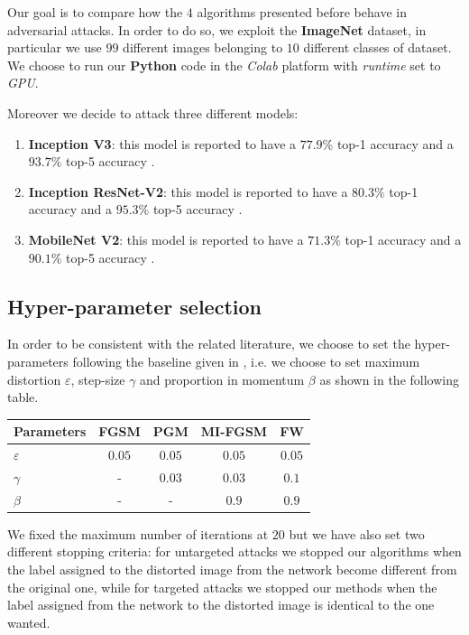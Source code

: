 \documentclass[10pt,twocolumn,letterpaper, english]{article}
\theoremstyle{definition}
\theoremstyle{plain}
\theoremstyle{plain}
\theoremstyle{plain}
\theoremstyle{plain}
\theoremstyle{remark}
\theoremstyle{remark}
\theoremstyle{definition}
\theoremstyle{definition}
\theoremstyle{definition}
\theoremstyle{definition}
\renewcommand{\epsilon}{\varepsilon}
\begin{document}
Our goal is to compare how the $4$ algorithms presented before behave in adversarial attacks. 
In order to do so, we exploit the \textbf{ImageNet} dataset, in particular we use $99$ different images belonging to $10$ different classes of dataset. 
We choose to run our \textbf{Python} code in the \textit{Colab} platform with \textit{runtime} set to \textit{GPU}.

Moreover we decide to attack three different models: 
\begin{enumerate}
    \item \textbf{Inception V3}: this model is reported to have a $77.9\%$ top-1 accuracy and a $93.7\%$ top-5 accuracy \cite{keras}.
    \item \textbf{Inception ResNet-V2}: this model is reported to have a $80.3\%$ top-1 accuracy and a	$95.3\%$ top-5 accuracy \cite{keras}.
    \item \textbf{MobileNet V2}: this model is reported to have a $71.3\%$ top-1 accuracy and a	$90.1\%$ top-5 accuracy \cite{keras}.
    
\end{enumerate}


\subsection{Hyper-parameter selection}

In order to be consistent with the related literature, we choose to set the hyper-parameters following the baseline given in \cite{frank}, i.e. we choose to set maximum distortion $\epsilon$, step-size $\gamma$ and proportion in momentum $\beta$ as shown in the following table. 


\begin{center}
    \begin{tabular}{l|c|c|c|c}
    \hline
     Parameters & FGSM & PGM & MI-FGSM & FW \\
     \hline
     $\epsilon$ & $0.05$ & $0.05$ & $0.05$ & $0.05$  \\
     
     $\gamma$ & - & $0.03$ & $0.03$ & $0.1$ \\
     
     $\beta$ & - & - & $0.9$ & $0.9$  \\
    \hline
   \end{tabular}
\end{center}

We fixed the maximum number of iterations at $20$ but we have also set two different stopping criteria: for untargeted attacks we stopped our algorithms when the label assigned to the distorted image from the network become different from the original one, while for targeted attacks we stopped our methods when the label assigned from the network to the distorted image is identical to the one wanted. \\
\end{document}
